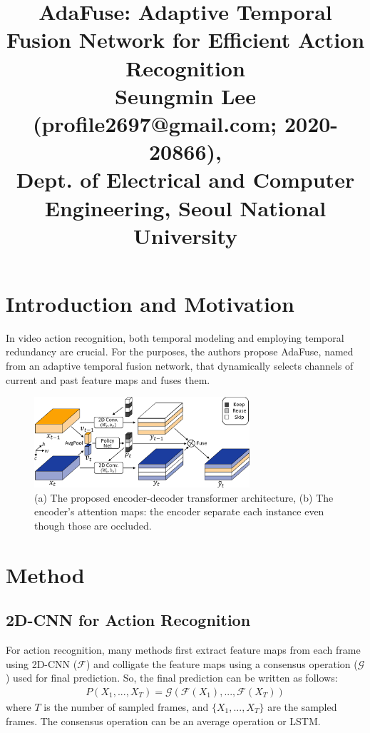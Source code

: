 \documentclass[10pt,twocolumn,letterpaper]{article}
\begin{document}
\title{AdaFuse: Adaptive Temporal Fusion Network for Efficient Action Recognition\\ {\rm {\normalsize Seungmin Lee (profile2697@gmail.com; 2020-20866), \\Dept. of Electrical and Computer Engineering, Seoul National University}}}   %

\maketitle
\thispagestyle{empty}

\section{Introduction and Motivation}
In video action recognition, both temporal modeling and employing temporal redundancy are crucial. For the purposes, the authors propose AdaFuse, named from an adaptive temporal fusion network, that dynamically selects channels of current and past feature maps and fuses them. 

\begin{figure}[b]
	\centering
	\includegraphics[width=8cm]{assets/shit.png}
	\caption{(a) The proposed encoder-decoder transformer architecture, (b) The encoder's attention maps: the encoder separate each instance even though those are occluded.}
	\label{fig:imgs}
\end{figure}

\section{Method}
\subsection{2D-CNN for Action Recognition}
For action recognition, many methods first extract feature maps from each frame using 2D-CNN ($\mathcal{F}$) and colligate the feature maps using a consensus operation ($\mathcal{G}$) used for final prediction. So, the final prediction can be written as follows:
\begin{align*}
	P(X_1, ..., X_T) = \mathcal{G}(\mathcal{F}(X_1), ...,\mathcal{F}(X_T))
\end{align*}
where $T$ is the number of sampled frames, and $\{X_1, ..., X_T\}$ are the sampled frames. The consensus operation can be an average operation or LSTM.
\end{document}
